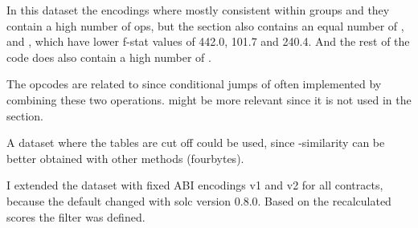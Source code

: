 \documentclass[../main.tex]{subfiles}
\begin{document}
In this dataset the  encodings where mostly consistent within groups and they contain a high number of  ops, but the  section also contains an equal number of ,  and , which have lower f-stat values of 442.0, 101.7 and 240.4. And the rest of the code does also contain a high number of .

The  opcodes are related to  since conditional jumps of often implemented by combining these two operations.  might be more relevant since it is not used in the  section.

A dataset where the  tables are cut off could be used, since -similarity can be better obtained with other methods (fourbytes).

I extended the dataset with fixed ABI encodings v1 and v2 for all contracts, because the default changed with solc version 0.8.0.
Based on the recalculated scores the  filter was defined.
\end{document}
